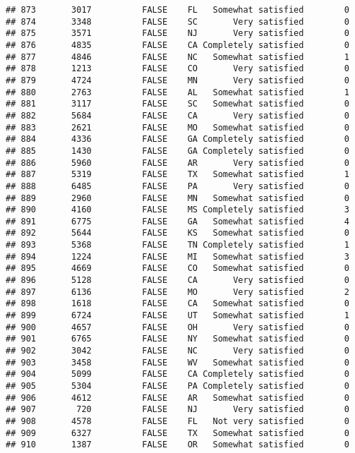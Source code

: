 \documentclass[]{book}
\theoremstyle{definition}
\theoremstyle{definition}
\theoremstyle{remark}
\begin{document}
\begin{verbatim}
## 873       3017          FALSE    FL   Somewhat satisfied        0
## 874       3348          FALSE    SC       Very satisfied        0
## 875       3571          FALSE    NJ       Very satisfied        0
## 876       4835          FALSE    CA Completely satisfied        0
## 877       4846          FALSE    NC   Somewhat satisfied        1
## 878       1213          FALSE    CO       Very satisfied        0
## 879       4724          FALSE    MN       Very satisfied        0
## 880       2763          FALSE    AL   Somewhat satisfied        1
## 881       3117          FALSE    SC   Somewhat satisfied        0
## 882       5684          FALSE    CA       Very satisfied        0
## 883       2621          FALSE    MO   Somewhat satisfied        0
## 884       4336          FALSE    GA Completely satisfied        0
## 885       1430          FALSE    GA Completely satisfied        0
## 886       5960          FALSE    AR       Very satisfied        0
## 887       5319          FALSE    TX   Somewhat satisfied        1
## 888       6485          FALSE    PA       Very satisfied        0
## 889       2960          FALSE    MN   Somewhat satisfied        0
## 890       4160          FALSE    MS Completely satisfied        3
## 891       6775          FALSE    GA   Somewhat satisfied        4
## 892       5644          FALSE    KS   Somewhat satisfied        0
## 893       5368          FALSE    TN Completely satisfied        1
## 894       1224          FALSE    MI   Somewhat satisfied        3
## 895       4669          FALSE    CO   Somewhat satisfied        0
## 896       5128          FALSE    CA       Very satisfied        0
## 897       6136          FALSE    MO       Very satisfied        2
## 898       1618          FALSE    CA   Somewhat satisfied        0
## 899       6724          FALSE    UT   Somewhat satisfied        1
## 900       4657          FALSE    OH       Very satisfied        0
## 901       6765          FALSE    NY   Somewhat satisfied        0
## 902       3042          FALSE    NC       Very satisfied        0
## 903       3458          FALSE    WV   Somewhat satisfied        0
## 904       5099          FALSE    CA Completely satisfied        0
## 905       5304          FALSE    PA Completely satisfied        0
## 906       4612          FALSE    AR   Somewhat satisfied        0
## 907        720          FALSE    NJ       Very satisfied        0
## 908       4578          FALSE    FL   Not very satisfied        0
## 909       6327          FALSE    TX   Somewhat satisfied        0
## 910       1387          FALSE    OR   Somewhat satisfied        0

\end{verbatim}
\end{document}

